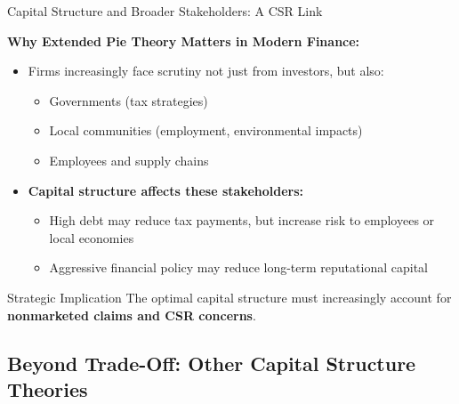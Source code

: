 \begin{frame}{Capital Structure and Broader Stakeholders: A CSR Link}
	
	\textbf{Why Extended Pie Theory Matters in Modern Finance:}
	
	\begin{itemize}
		\item Firms increasingly face scrutiny not just from investors, but also:
		\begin{itemize}
			\item Governments (tax strategies)
			\item Local communities (employment, environmental impacts)
			\item Employees and supply chains
		\end{itemize}
		
		\item \textbf{Capital structure affects these stakeholders:}
		\begin{itemize}
			\item High debt may reduce tax payments, but increase risk to employees or local economies
			\item Aggressive financial policy may reduce long-term reputational capital
		\end{itemize}
	\end{itemize}
	
	\vspace{0.2cm}
	\begin{alertblock}{Strategic Implication}
		The optimal capital structure must increasingly account for \textbf{nonmarketed claims and CSR concerns}.
	\end{alertblock}
	
\end{frame}

\subsection{Beyond Trade-Off: Other Capital Structure Theories}



